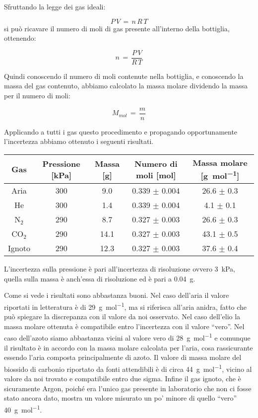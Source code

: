 Sfruttando la legge dei gas ideali:

\begin{equation}
	P\,V \,=\, n\,R\,T
\end{equation}
%
si può ricavare il numero di moli di gas presente all'interno della bottiglia, ottenendo:

\begin{equation}
	n \,=\, \frac{P\,V}{R\,T}
\end{equation}

Quindi conoscendo il numero di moli contenute nella bottiglia, e conoscendo la massa del gas contenuto,
abbiamo calcolato la massa molare dividendo la massa per il numero di moli:

\begin{equation}
	M_{mol} \,=\, \frac{m}{n}
\end{equation}

Applicando a tutti i gas questo procedimento e propagando opportunamente l'incertezza
abbiamo ottenuto i seguenti risultati. 

\begin{center}
    \begin{tabular}{c c c c c}
        \toprule
        Gas & Pressione [\si{\kilo\pascal}] & Massa [\si{\gram}] & Numero di moli [\si{\mole}] & Massa molare [\si{\gram\per\mole}] \\
        \midrule
        Aria            & 300 &  9.0 & 0.339 $\pm$ 0.004 & 26.6 $\pm$ 0.3 \\
        He              & 300 &  1.4 & 0.339 $\pm$ 0.004 &  4.1 $\pm$ 0.1 \\
        N$_2$           & 290 &  8.7 & 0.327 $\pm$ 0.003 & 26.6 $\pm$ 0.3 \\
        CO$_2$          & 290 & 14.1 & 0.327 $\pm$ 0.003 & 43.1 $\pm$ 0.5 \\
        Ignoto          & 290 & 12.3 & 0.327 $\pm$ 0.003 & 37.6 $\pm$ 0.4 \\
        \bottomrule
    \end{tabular}
\end{center}

L'incertezza sulla pressione è pari all'incertezza di risoluzione ovvero \SI{3}{\kilo\pascal}, quella sulla massa
è anch'essa di risoluzione ed è pari a \SI{0.04}{\gram}.

Come si vede i risultati sono abbastanza buoni. Nel caso dell'aria il valore riportati in letteratura è di \SI{29}{\gram\per\mole},
ma si riferisca all'aria anidra, fatto che può spiegare la discrepanza con il valore da noi osservato. Nel caso dell'elio
la massa molare ottenuta è compatibile entro l'incertezza con il valore ``vero''. Nel caso dell'azoto siamo
abbastanza vicini al valore vero di \SI{28}{\gram\per\mole} e comunque il risultato è in accordo con la massa molare calcolata per l'aria,
cosa rassicurante essendo l'aria composta principalmente di azoto. Il valore di massa molare del biossido di carbonio
riportato da fonti attendibili è di circa \SI{44}{\gram\per\mole}, vicino al valore da noi trovato e compatibile entro due sigma.
Infine il gas ignoto, che è sicuramente Argon, poiché era l'unico gas presente in laboratorio che non ci fosse stato
ancora dato, mostra un valore misurato un po' minore di quello ``vero'' \SI{40}{\gram\per\mole}.

